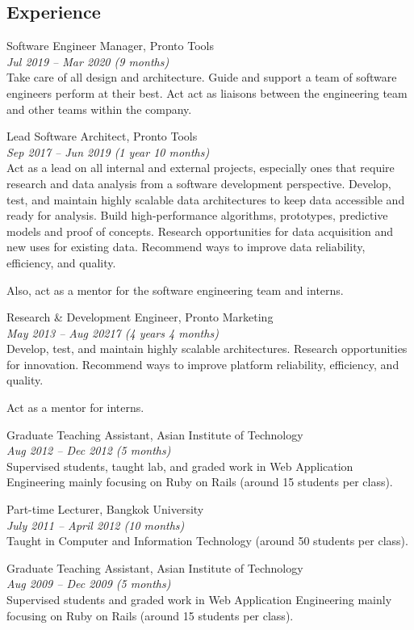 \documentclass[margin, 10pt]{res}
\begin{document}
\begin{resume}
\section{Experience}

Software Engineer Manager, Pronto Tools\\
{\it \small Jul 2019 -- Mar 2020 (9 months)}\\
Take care of all design and architecture. Guide and support a team of
software engineers perform at their best. Act act as liaisons between
the engineering team and other teams within the company.

Lead Software Architect, Pronto Tools\\
{\it \small Sep 2017 -- Jun 2019 (1 year 10 months)}\\
Act as a lead on all internal and external projects, especially ones that
require research and data analysis from a software development perspective.
Develop, test, and maintain highly scalable data architectures to keep data
accessible and ready for analysis. Build high-performance algorithms,
prototypes, predictive models and proof of concepts. Research opportunities
for data acquisition and new uses for existing data. Recommend ways to
improve data reliability, efficiency, and quality.

Also, act as a mentor for the software engineering team and interns.

Research \& Development Engineer, Pronto Marketing\\
{\it \small May 2013 -- Aug 20217 (4 years 4 months)}\\
Develop, test, and maintain highly scalable architectures.
Research opportunities for innovation. Recommend ways to improve
platform reliability, efficiency, and quality.

Act as a mentor for interns.

Graduate Teaching Assistant, Asian Institute of Technology\\
{\it \small Aug 2012 -- Dec 2012 (5 months)}\\
Supervised students, taught lab, and graded work in Web Application Engineering
mainly focusing on Ruby on Rails (around 15 students per class).

Part-time Lecturer, Bangkok University\\
{\it \small July 2011 -- April 2012 (10 months)}\\
Taught in Computer and Information Technology (around 50 students per class).

Graduate Teaching Assistant, Asian Institute of Technology\\
{\it \small Aug 2009 -- Dec 2009 (5 months)}\\
Supervised students and graded work in Web Application Engineering mainly focusing
on Ruby on Rails (around 15 students per class).


\end{resume}
\end{document}
